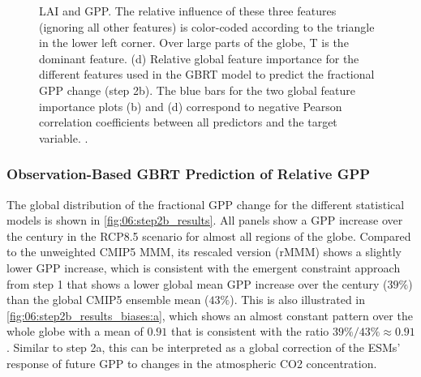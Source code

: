 \begin{figure}[p]
{    \acf{LAI} and \acs{GPP}. The relative influence of these three features
    (ignoring all other features) is color-coded according to the triangle in
    the lower left corner. Over large parts of the globe, \acs{T} is the
    dominant feature. (d) Relative global feature importance for the different
    features used in the \acs{GBRT} model to predict the fractional \acs{GPP}
    change (step 2b). The blue bars for the two global feature importance plots
    (b) and (d) correspond to negative Pearson correlation coefficients between
    all predictors and the target variable. .
  }
  \label{fig:06:step2b_ml_inference}
\end{figure}


\subsubsection{Observation-Based \acs{GBRT} Prediction of Relative \acs{GPP}}
\label{subsubsec:06:results_step2b_obs}

The global distribution of the fractional \ac{GPP} change for the different
statistical models is shown in \cref{fig:06:step2b_results}. All panels show a
\ac{GPP} increase over the  century in the \acs{RCP}8.5 scenario for
almost all regions of the globe. Compared to the unweighted \acs{CMIP}5
\ac{MMM}, its rescaled version (r\acs{MMM}) shows a slightly lower \ac{GPP}
increase, which is consistent with the emergent constraint approach from step 1
that shows a lower global mean \ac{GPP} increase over the  century ($39
\unit{\%}$) than the global \acs{CMIP}5 ensemble mean ($43 \unit{\%}$). This is
also illustrated in \cref{fig:06:step2b_results_biases:a}, which shows an
almost constant pattern over the whole globe with a mean of $0.91$ that is
consistent with the ratio $39 \unit{\%} / 43 \unit{\%} \approx 0.91$. Similar
to step 2a, this can be interpreted as a global correction of the \acp{ESM}'
response of future \ac{GPP} to changes in the atmospheric \ac{CO2}
concentration.

